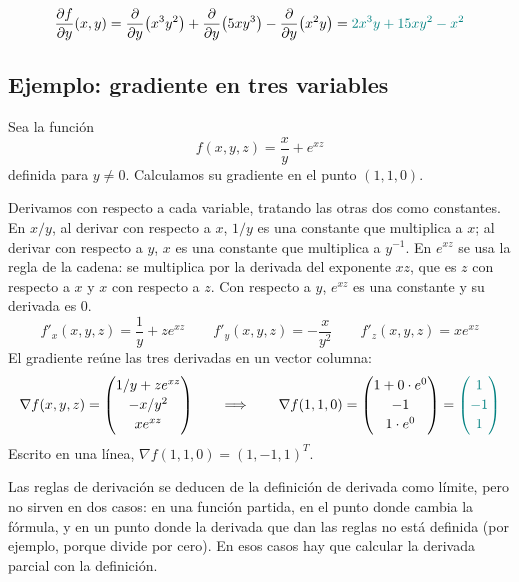 \documentclass{article}
\begin{document}
\[
\frac{\partial f}{\partial y}(x,y)
=\frac{\partial}{\partial y}\bigl(x^{3}y^{2}\bigr)
+\frac{\partial}{\partial y}\bigl(5xy^{3}\bigr)
-\frac{\partial}{\partial y}\bigl(x^{2}y\bigr)
=\color{teal}2x^{3}y + 15xy^{2} - x^{2}
\]



\subsection*{Ejemplo: gradiente en tres variables}

Sea la función
\[
f(x,y,z)=\frac{x}{y}+e^{xz}
\]
definida para \(y\neq0\). Calculamos su gradiente en el punto \((1,1,0)\).

Derivamos con respecto a cada variable, tratando las otras dos como constantes. En \(x/y\), al derivar con respecto a \(x\), \(1/y\) es una constante que multiplica a \(x\); al derivar con respecto a \(y\), \(x\) es una constante que multiplica a \(y^{-1}\). En \(e^{xz}\) se usa la regla de la cadena: se multiplica por la derivada del exponente \(xz\), que es \(z\) con respecto a \(x\) y \(x\) con respecto a \(z\). Con respecto a \(y\), \(e^{xz}\) es una constante y su derivada es \(0\).
\[
f'_x(x,y,z)=\frac{1}{y}+ze^{xz}
\qquad
f'_y(x,y,z)=-\frac{x}{y^{2}}
\qquad
f'_z(x,y,z)=xe^{xz}
\]
El gradiente reúne las tres derivadas en un vector columna:
\[
\nabla f(x,y,z)=
\begin{pmatrix}
1/y+ze^{xz}\\[2pt]
-x/y^{2}\\[2pt]
xe^{xz}
\end{pmatrix}
\qquad\Longrightarrow\qquad
\nabla f(1,1,0)=
\begin{pmatrix}
1+0\cdot e^{0}\\[2pt]
-1\\[2pt]
1\cdot e^{0}
\end{pmatrix}
=
\color{teal}
\begin{pmatrix}
1\\[2pt]
-1\\[2pt]
1
\end{pmatrix}
\]
Escrito en una línea, \(\nabla f(1,1,0)=(1,-1,1)^{T}\).



Las reglas de derivación se deducen de la definición de derivada como límite, pero no sirven en dos casos: en una función partida, en el punto donde cambia la fórmula, y en un punto donde la derivada que dan las reglas no está definida (por ejemplo, porque divide por cero). En esos casos hay que calcular la derivada parcial con la definición.
\end{document}
